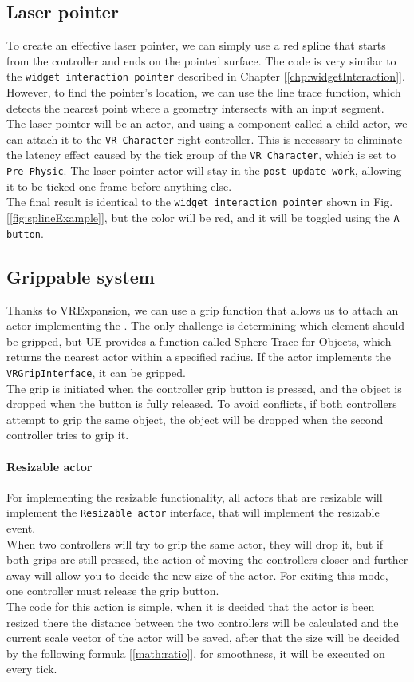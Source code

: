 \subsection{Laser pointer}
\noindent
To create an effective laser pointer, we can simply use a red spline that starts from the controller and ends on the pointed surface. The code is very similar to the \texttt{widget interaction pointer} described in Chapter [\ref{chp:widgetInteraction}]. However, to find the pointer's location, we can use the line trace function, which detects the nearest point where a geometry intersects with an input segment.\\
The laser pointer will be an actor, and using a component called a child actor, we can attach it to the \texttt{VR Character} right controller. This is necessary to eliminate the latency effect caused by the tick group of the \texttt{VR Character}, which is set to \texttt{Pre Physic}. The laser pointer actor will stay in the \texttt{post update work}, allowing it to be ticked one frame before anything else.\\
The final result is identical to the \texttt{widget interaction pointer} shown in Fig.[\ref{fig:splineExample}], but the color will be red, and it will be toggled using the \texttt{A button}.

\subsection{Grippable system}
\noindent
Thanks to VRExpansion, we can use a grip function that allows us to attach an actor implementing the .
The only challenge is determining which element should be gripped, but \ac{UE} provides a function called Sphere Trace for Objects, which returns the nearest actor within a specified radius.
If the actor implements the \texttt{VRGripInterface}, it can be gripped.\\
The grip is initiated when the controller grip button is pressed, and the object is dropped when the button is fully released.
To avoid conflicts, if both controllers attempt to grip the same object, the object will be dropped when the second controller tries to grip it.

\paragraph{Resizable actor}
For implementing the resizable functionality, all actors that are resizable will implement the \texttt{Resizable actor} interface, that will implement the resizable event.\\
When two controllers will try to grip the same actor, they will drop it, but if both grips are still pressed, the action of moving the controllers closer and further away will allow you to decide the new size of the actor.
For exiting this mode, one controller must release the grip button.\\
The code for this action is simple, when it is decided that the actor is been resized there the distance between the two controllers will be calculated and the current scale vector of the actor will be saved, after that the size will be decided by the following formula [\ref{math:ratio}], for smoothness, it will be executed on every tick.

